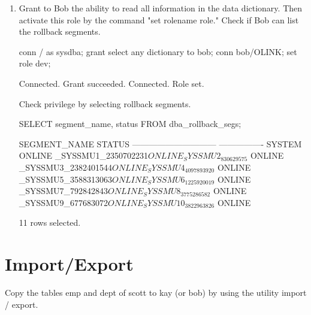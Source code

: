 \documentclass{article}
\begin{document}
\begin{enumerate}
\item{Grant to Bob the ability to read all information in the data dictionary. Then activate this role by the command "set rolename role." Check if Bob can list the rollback segments.}
\begin{sqlshell}
conn / as sysdba;
grant select any dictionary to bob;
conn bob/OLINK;
set role dev;
\end{sqlshell}
\begin{messageshell}
Connected.
Grant succeeded.
Connected.
Role set.
\end{messageshell}
Check privilege by selecting rollback segments.
\begin{sqlshell}
SELECT segment_name, status FROM dba_rollback_segs;
\end{sqlshell}
\begin{messageshell}
SEGMENT_NAME                   STATUS
------------------------------ ----------------
SYSTEM                         ONLINE
_SYSSMU1_2350702231$           ONLINE
_SYSSMU2_830629575$            ONLINE
_SYSSMU3_2382401544$           ONLINE
_SYSSMU4_4097893920$           ONLINE
_SYSSMU5_3588313063$           ONLINE
_SYSSMU6_1225920019$           ONLINE
_SYSSMU7_792842843$            ONLINE
_SYSSMU8_3775286582$           ONLINE
_SYSSMU9_677683072$            ONLINE
_SYSSMU10_3822963826$          ONLINE

11 rows selected.
\end{messageshell}

\end{enumerate}
\section{Import/Export}
Copy the tables emp and dept of scott to kay (or bob) by using the utility import / export.
\end{document}
